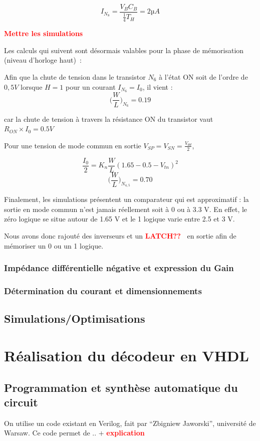 \documentclass[11pt]{article}
\begin{document}
\[
I_{N_8} = \frac {V_B C_B}{\frac{1}{4} T_H} = 2 µA
\]

\textbf{\textcolor{red}{Mettre les simulations}}

\clearpage

Les calculs qui suivent sont d\'esormais valables pour la phase de m\'emorisation (niveau d’horloge haut) :

Afin que la chute de tension dans le transistor $N_6$  \`a l’\'etat ON soit de l’ordre de $0,5 V$ lorsque $H=1$
pour un courant $I_{N_6}= I_0$, il vient :
\[
  \bigg(\frac{W}{L} \bigg)_{N_6} = 0.19
\]

car la chute de tension \`a travers la r\'esistance ON du transistor vaut $R_{ON} \times I_0 = 0.5V$

Pour une tension de mode commun en sortie $V_{SP}=V_{SN} = \frac{V_{dd}}{2}$,

\[
  \frac{I_0}{2} = K_n \frac{W}{L}(1.65-0.5 - V_{tn})^2
\]
\[
  \bigg(\frac{W}{L} \bigg)_{N_{4,5}} = 0.70
\]

Finalement, les simulations pr\'esentent un comparateur qui est approximatif : la sortie en mode
commun n’est jamais r\'eellement soit \`a 0 ou \`a 3.3 V. En effet, le z\'ero logique se situe autour de 1.65 V
et le 1 logique varie entre 2.5 et 3 V.

Nous avons donc rajout\'e des inverseurs et un \textbf{\textcolor{red}{LATCH??} } en sortie afin de m\'emoriser
un 0 ou un 1 logique.

\subsubsection{Imp\'edance diff\'erentielle n\'egative et expression du Gain}
\subsubsection{D\'etermination du courant et dimensionnements}
\subsection{Simulations/Optimisations}

\clearpage

\section{R\'ealisation du d\'ecodeur en VHDL}
\subsection{Programmation et synth\`ese automatique du circuit}
On utilise un code existant en Verilog, fait par ``Zbigniew	Jaworski'', universit\'e de Warsaw.
Ce code permet de .. $+$ \textbf{\textcolor{red}{explication}}
\end{document}
